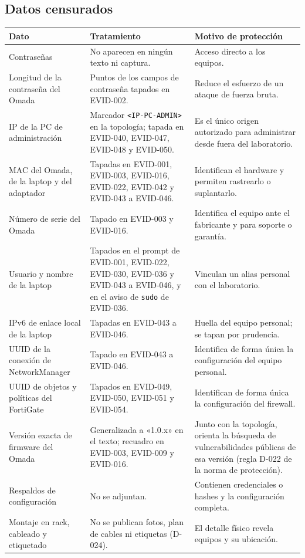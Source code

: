 \documentclass[11pt,a4paper]{article}
\newcommand{\cab}{\rowcolor{light}}
\begin{document}
\subsection{Datos censurados}
{\small
\begin{longtable}{L{3.4cm} L{6.0cm} L{5.6cm}}
  \toprule
  \cab\textbf{Dato} & \textbf{Tratamiento} & \textbf{Motivo de protección}\\
  \midrule
  \endhead
  Contraseñas & No aparecen en ningún texto ni captura. & Acceso directo a los equipos.\\
  Longitud de la contraseña del Omada & Puntos de los campos de contraseña tapados en EVID-002. & Reduce el esfuerzo de un ataque de fuerza bruta.\\
  IP de la PC de administración & Marcador \texttt{<IP-PC-ADMIN>} en la topología; tapada en EVID-040, EVID-047, EVID-048 y EVID-050. & Es el único origen autorizado para administrar desde fuera del laboratorio.\\
  MAC del Omada, de la laptop y del adaptador & Tapadas en EVID-001, EVID-003, EVID-016, EVID-022, EVID-042 y EVID-043 a EVID-046. & Identifican el hardware y permiten rastrearlo o suplantarlo.\\
  Número de serie del Omada & Tapado en EVID-003 y EVID-016. & Identifica el equipo ante el fabricante y para soporte o garantía.\\
  Usuario y nombre de la laptop & Tapados en el prompt de EVID-001, EVID-022, EVID-030, EVID-036 y EVID-043 a EVID-046, y en el aviso de \texttt{sudo} de EVID-036. & Vinculan un alias personal con el laboratorio.\\
  IPv6 de enlace local de la laptop & Tapadas en EVID-043 a EVID-046. & Huella del equipo personal; se tapan por prudencia.\\
  UUID de la conexión de NetworkManager & Tapado en EVID-043 a EVID-046. & Identifica de forma única la configuración del equipo personal.\\
  UUID de objetos y políticas del FortiGate & Tapados en EVID-049, EVID-050, EVID-051 y EVID-054. & Identifican de forma única la configuración del firewall.\\
  Versión exacta de firmware del Omada & Generalizada a «1.0.x» en el texto; recuadro en EVID-003, EVID-009 y EVID-016. & Junto con la topología, orienta la búsqueda de vulnerabilidades públicas de esa versión (regla D-022 de la norma de protección).\\
  Respaldos de configuración & No se adjuntan. & Contienen credenciales o hashes y la configuración completa.\\
  Montaje en rack, cableado y etiquetado & No se publican fotos, plan de cables ni etiquetas (D-024). & El detalle físico revela equipos y su ubicación.\\
  \bottomrule
\end{longtable}
}
\end{document}
